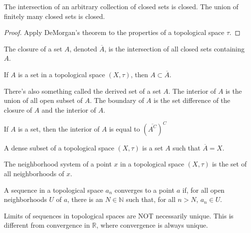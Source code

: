         \begin{theorem}
            The intersection of an arbitrary collection of
            closed sets is closed. The union of finitely
            many closed sets is closed.
        \end{theorem}
        \begin{proof}
            Apply DeMorgan's theorem to the properties
            of a topological space $\tau$.
        \end{proof}
        \begin{definition}
            The closure of a set $A$,
            denoted $\overline{A}$, is the
            intersection of all closed sets
            containing $A$.
        \end{definition}
        \begin{theorem}
            If $A$ is a set in a topological space
            $(X,\tau)$, then $A\subset\overline{A}$.
        \end{theorem}
        There's also something called the derived
        set of a set $A$. The interior of $A$
        is the union of all open subset of $A$.
        The boundary of $A$ is the set difference
        of the closure of $A$ and the interior of
        $A$.
        \begin{theorem}
            If $A$ is a set, then
            the interior of $A$ is equal to
            $(\overline{A^{C}})^{C}$
        \end{theorem}
        \begin{definition}
            A dense subset of a topological
            space $(X,\tau)$ is a set $A$
            such that $\overline{A}=X$.
        \end{definition}
        \begin{definition}
            The neighborhood system of a point
            $x$ in a topological space $(X,\tau)$
            is the set of all neighborhoods of
            $x$.
        \end{definition}
        \begin{definition}
            A sequence in a topological space
            $a_{n}$ converges to a point $a$ if,
            for all open neighborhoods $U$ of $a$,
            there is an $N\in\mathbb{N}$ such that,
            for all $n>N$, $a_{n}\in{U}$.
        \end{definition}
        Limits of sequences in topological spaces are NOT
        necessarily unique. This is different from convergence
        in $\mathbb{R}$, where convergence is always unique.
